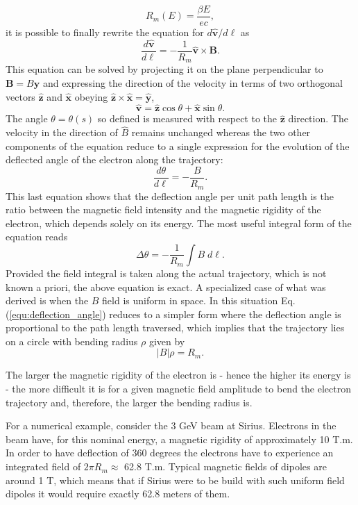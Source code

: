 \begin{equation}
R_m(E) = \frac{\beta E}{ec},
\end{equation}
it is possible to finally rewrite the equation for $d\bm{\hat{v}}/d\ell$ as 
\begin{equation}
\frac{d\bm{\hat{v}}}{d\ell} = -\frac{1}{R_m} \bm{\hat{v}} \times \bm{B}.
\end{equation}
This equation can be solved by projecting it on the plane perpendicular to $\bm{B} = B\bm{\hat{y}}$ and expressing the direction of the velocity in terms of two orthogonal vectors $\bm{\hat{z}}$ and $\bm{\hat{x}}$ obeying $\bm{\hat{z}} \times \bm{\hat{x}} = \bm{\hat{y}}$, 
\begin{equation}
\bm{\hat{v}} = \bm{\hat{z}} \cos \theta + \bm{\hat{x}} \sin \theta.
\end{equation} 
The angle $\theta = \theta(s)$ so defined is measured with respect to the $\bm{\hat{z}}$ direction. The velocity in the direction of $\hat{B}$ remains unchanged whereas the two other components of the equation reduce to a single expression for the evolution of the deflected angle of the electron along the trajectory:
\begin{equation}
\frac{d\theta}{d\ell}  = - \frac{B}{R_m}. 
\end{equation} 
This last equation shows that the deflection angle per unit path length is the ratio between the magnetic field intensity and the magnetic rigidity of the electron, which depends solely on its energy. The most useful integral form of the equation reads
\begin{equation}
\label{equ:deflection_angle}
\Delta \theta = - \frac{1}{R_m} \int{B \; d\ell}.
\end{equation} 
Provided the field integral is taken along the actual trajectory, which is not known a priori, the above equation is exact.
A specialized case of what was derived is when the $B$ field is uniform in space. In this situation Eq.(\ref{equ:deflection_angle}) reduces to a simpler form where the deflection angle is proportional to the path length traversed, which implies that the trajectory lies on a circle with bending radius $\rho$ given by
\begin{equation}
|B| \rho = {R_m}.
\end{equation} 

The larger the magnetic rigidity of the electron is - hence the higher its energy is - the more difficult it is for a given magnetic field amplitude to bend the electron trajectory and, therefore, the larger the bending radius is.

For a numerical example, consider the 3 GeV beam at Sirius. Electrons in the beam have, for this nominal energy, a magnetic rigidity of approximately 10 T.m. In order to have deflection of 360 degrees the electrons have to experience an integrated field of $2\pi R_m \approx$ 62.8 T.m. Typical magnetic fields of dipoles are around 1 T, which means that if Sirius were to be build with such uniform field dipoles it would require exactly 62.8 meters of them.